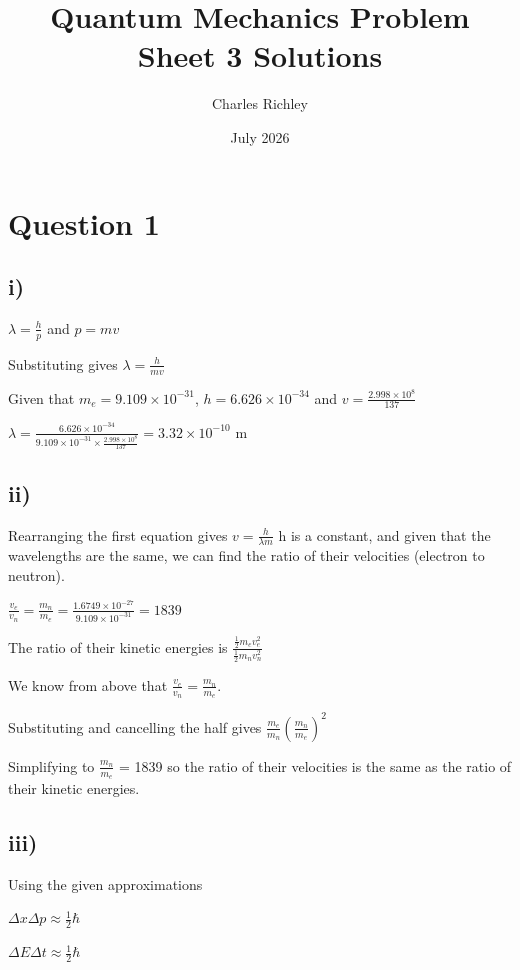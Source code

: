 \documentclass{article}
\title{Quantum Mechanics Problem Sheet 3 Solutions}
\author{Charles Richley}
\date{July 2026}
\begin{document}
\maketitle

\section{Question 1}

\subsection*{i)}
$\lambda = \frac{h}{p}$ and $p = mv$ 

Substituting gives $\lambda = \frac{h}{mv}$

Given that $m_e = 9.109  \times 10^{-31}$, $h = 6.626 \times10^{-34}$ and $v = \frac{2.998 \times 10^{8}}{137}$

$\lambda = \frac{6.626 \times 10^{-34}}{9.109 \times 10^{-31} \times \frac{2.998 \times 10^{8}}{137}} = 3.32 \times 10^{-10} \text{ m}$

\subsection*{ii)}
Rearranging the first equation gives $v = \frac{h}{\lambda m}$
h is a constant, and given that the wavelengths are the same, we can find the ratio of their velocities (electron to neutron).

$\frac{v_e}{v_n} = \frac{m_n}{m_e} = \frac{1.6749 \times 10^{-27}}{9.109 \times 10^{-31}} = 1839$

The ratio of their kinetic energies is $\frac{\frac{1}{2}m_e v_e^2}{\frac{1}{2} m_n v_n^2}$

We know from above that $\frac{v_e}{v_n} = \frac{m_n}{m_e}$.

Substituting and cancelling the half gives $\frac{m_e}{m_n} (\frac{m_n}{m_e})^2$ 

Simplifying to $\frac{m_n}{m_e}$ = 1839 so the ratio of their velocities is the same as the ratio of their kinetic energies.

\subsection*{iii)}
Using the given approximations

$\Delta x\Delta p \approx \frac{1}{2} \hbar$

$\Delta E \Delta t \approx \frac{1}{2} \hbar$
\end{document}
